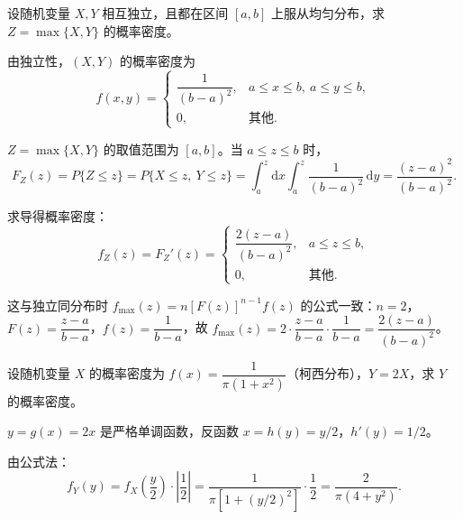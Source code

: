 ﻿\documentclass[lang=cn,11pt]{elegantbook}
\begin{document}
\begin{exercise}[均匀分布最大值密度] \label{exer:3-10b}
设随机变量 $X, Y$ 相互独立，且都在区间 $[a, b]$ 上服从均匀分布，求 $Z = \max\{X, Y\}$ 的概率密度。
\end{exercise}

\begin{solution}
由独立性，$(X,Y)$ 的概率密度为
\[
f(x,y) = \begin{cases} \dfrac{1}{(b-a)^2}, & a \leqslant x \leqslant b,\ a \leqslant y \leqslant b, \\ 0, & \text{其他}. \end{cases}
\]

$Z = \max\{X, Y\}$ 的取值范围为 $[a, b]$。当 $a \leqslant z \leqslant b$ 时，
\[
F_Z(z) = P\{Z \leqslant z\} = P\{X \leqslant z,\ Y \leqslant z\} = \int_a^z\mathrm{d}x\int_a^z \frac{1}{(b-a)^2}\,\mathrm{d}y = \frac{(z-a)^2}{(b-a)^2}.
\]

求导得概率密度：
\[
f_Z(z) = F_Z'(z) = \begin{cases} \dfrac{2(z-a)}{(b-a)^2}, & a \leqslant z \leqslant b, \\ 0, & \text{其他}. \end{cases}
\]

\begin{note}
这与独立同分布时 $f_{\max}(z) = n[F(z)]^{n-1}f(z)$ 的公式一致：$n=2$，$F(z) = \dfrac{z-a}{b-a}$，$f(z) = \dfrac{1}{b-a}$，故 $f_{\max}(z) = 2 \cdot \dfrac{z-a}{b-a} \cdot \dfrac{1}{b-a} = \dfrac{2(z-a)}{(b-a)^2}$。
\end{note}
\end{solution}

\begin{exercise}[柯西分布线性变换] \label{exer:3-11}
设随机变量 $X$ 的概率密度为 $f(x) = \dfrac{1}{\pi(1+x^2)}$（柯西分布），$Y = 2X$，求 $Y$ 的概率密度。
\end{exercise}

\begin{solution}
$y = g(x) = 2x$ 是严格单调函数，反函数 $x = h(y) = y/2$，$h'(y) = 1/2$。

由公式法：
\[
f_Y(y) = f_X\!\left(\frac{y}{2}\right) \cdot \left|\frac{1}{2}\right| = \frac{1}{\pi\left[1 + (y/2)^2\right]} \cdot \frac{1}{2} = \frac{2}{\pi(4+y^2)}.
\]
\end{solution}
\end{document}
